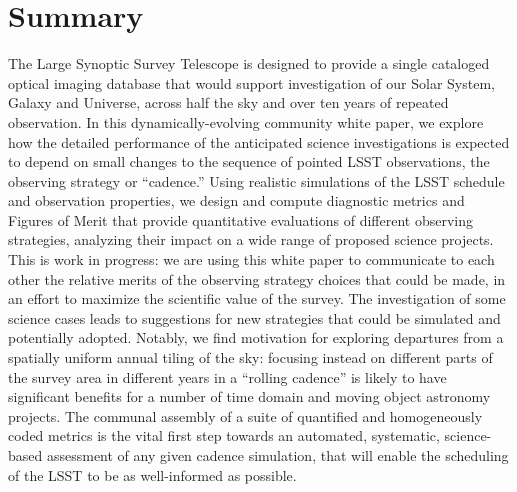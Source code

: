 \setcounter{chapter}{0}
\chapter*{Summary}
\def\chpname{summary}\label{chp:\chpname}
\markboth{}{}


\noindent
The Large Synoptic Survey Telescope is designed to provide a single
cataloged optical imaging database that would support investigation of
our Solar System, Galaxy and Universe, across half the sky and over ten
years of repeated observation.
%
In this dynamically-evolving community white paper, we explore how the
detailed performance of the anticipated science investigations is
expected to depend on small changes to the sequence of pointed LSST
observations, the observing strategy or ``cadence.''
%
Using realistic simulations of the LSST schedule and observation
properties, we design and compute diagnostic metrics and Figures of
Merit that provide quantitative evaluations of different observing
strategies, analyzing their impact on a wide range of proposed science
projects.
%
This is work in progress: we are using this white paper to communicate
to each other the relative merits of the observing strategy choices that
could be made, in an effort to maximize the scientific value of the
survey.
%
The investigation of some science cases leads to suggestions for new
strategies that could be simulated and potentially adopted.
%
Notably, we find motivation for exploring departures from a spatially
uniform annual tiling of the sky: focusing instead on different parts of
the survey area in different years in a ``rolling cadence'' is likely to
have significant benefits for a number of time domain and moving object
astronomy projects.
%
The communal assembly of a suite of quantified and homogeneously coded
metrics is the vital first step towards an automated, systematic,
science-based assessment of any given cadence simulation, that will
enable the scheduling of the LSST to be as well-informed as possible.

\clearpage
